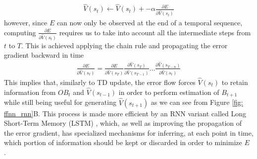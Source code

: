 \begin{gather}
\label{bptt_1}
    \widehat{V}(s_t) \leftarrow \widehat{V}(s_t) + -\alpha \frac{\partial E}{\partial \widehat{V}(s_t)}
\end{gather}
however, since $E$ can now only be observed at the end of a temporal sequence, computing $\frac{\partial E}{\partial \widehat{V}(s_t)}$ requires us to take into account all the intermediate steps from $t$ to $T$. This is achieved applying the chain rule and propagating the error gradient backward in time \cite{bengio2017deep,lillicrap2019backpropagation}
\begin{gather}
\label{bptt_2}
    \frac{\partial E}{\partial \widehat{V}(s_t)} = 
    \frac{\partial E}{\partial \widehat{V}(s_{T})}
    \frac{\partial \widehat{V}(s_{T})}{\partial \widehat{V}(s_{T-1})}
    \dots
    \frac{\partial \widehat{V}(s_{T-n})}{\partial \widehat{V}(s_{t})}
\end{gather}
This implies that, similarly to TD update, the error flow forces $\widehat{V}(s_t)$ to retain information from $OB_t$ and $\widehat{V}(s_{t-1})$ in order to perform estimation of $B_{t+1}$ while still being useful for generating $\widehat{V}(s_{t+1})$ as we can see from Figure \ref{fig: ffnn_rnn}B. This process is made more efficient by an RNN variant called Long Short-Term Memory (LSTM) \cite{hochreiter1997long}, which, as well as improving the propagation of the error gradient, has specialized mechanisms for inferring, at each point in time, which portion of information should be kept or discarded in order to minimize $E$ \cite{hochreiter1997long,bengio2017deep}.



